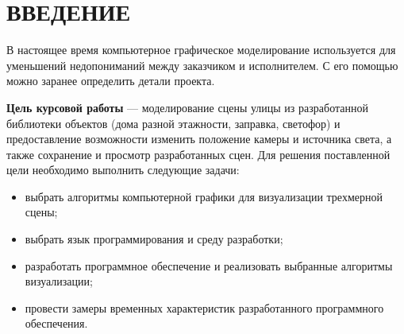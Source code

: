 \chapter*{ВВЕДЕНИЕ}


В настоящее время компьютерное графическое моделирование
используется для уменьшений недопониманий между заказчиком и исполнителем.
С его помощью можно заранее определить детали проекта.

\textbf{Цель курсовой работы} --- моделирование сцены улицы из разработанной библиотеки
объектов (дома разной этажности, заправка, светофор) и предоставление возможности изменить
положение камеры и источника света, а также сохранение и просмотр разработанных сцен. Для
решения поставленной цели необходимо выполнить следующие задачи:
\begin{itemize}
    \item выбрать алгоритмы компьютерной графики для визуализации трехмерной
        сцены;
    \item выбрать язык программирования и среду разработки;
    \item разработать программное обеспечение и реализовать выбранные алгоритмы визуализации;
    \item провести замеры временных характеристик разработанного программного обеспечения.
\end{itemize}



